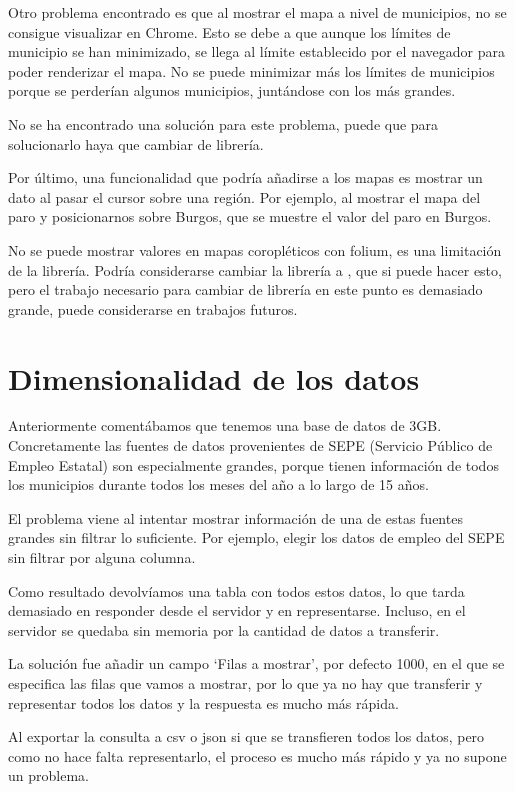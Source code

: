 Otro problema encontrado es que al mostrar el mapa a nivel de municipios, no se consigue visualizar en Chrome. Esto se debe a que aunque los límites de municipio se han minimizado, se llega al límite establecido por el navegador para poder renderizar el mapa. No se puede minimizar más los límites de municipios porque se perderían algunos municipios, juntándose con los más grandes.

No se ha encontrado una solución para este problema, puede que para solucionarlo haya que cambiar de librería.

Por último, una funcionalidad que podría añadirse a los mapas es mostrar un dato al pasar el cursor sobre una región. Por ejemplo, al mostrar el mapa del paro y posicionarnos sobre Burgos, que se muestre el valor del paro en Burgos.

No se puede mostrar valores en mapas coropléticos con folium, es una limitación de la librería. Podría considerarse cambiar la librería a , que si puede hacer esto, pero el trabajo necesario para cambiar de librería en este punto es demasiado grande, puede considerarse en trabajos futuros.

\section{Dimensionalidad de los datos}

Anteriormente comentábamos que tenemos una base de datos de 3GB. Concretamente las fuentes de datos provenientes de SEPE (Servicio Público de Empleo Estatal) son especialmente grandes, porque tienen información de todos los municipios durante todos los meses del año a lo largo de 15 años.

El problema viene al intentar mostrar información de una de estas fuentes grandes sin filtrar lo suficiente. Por ejemplo, elegir los datos de empleo del SEPE sin filtrar por alguna columna.

Como resultado devolvíamos una tabla con todos estos datos, lo que tarda demasiado en responder desde el servidor y en representarse. Incluso, en el servidor se quedaba sin memoria por la cantidad de datos a transferir.

La solución fue añadir un campo `Filas a mostrar', por defecto 1000, en el que se especifica las filas que vamos a mostrar, por lo que ya no hay que transferir y representar todos los datos y la respuesta es mucho más rápida.

Al exportar la consulta a csv o json si que se transfieren todos los datos, pero como no hace falta representarlo, el proceso es mucho más rápido y ya no supone un problema.

